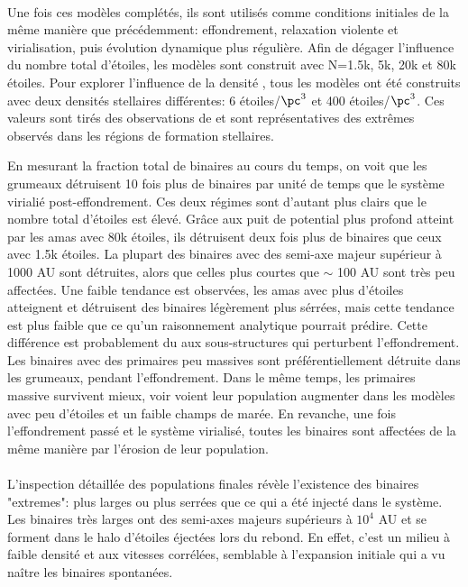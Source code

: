 \paragraph*{}
Une fois ces modèles complétés, ils sont utilisés comme conditions initiales de la même manière que précédemment: effondrement, relaxation violente et virialisation, puis évolution dynamique plus régulière. Afin de dégager l'influence du nombre total d'étoiles, les modèles sont construit avec N=1.5k, 5k, 20k et 80k étoiles. Pour explorer l'influence de la densité , tous les modèles ont été construits avec deux densités stellaires différentes: 6 étoiles/$\pc^3$ et 400 étoiles/$\pc^3$. Ces valeurs sont tirés des observations de \cite{King2012,King2012a} et sont représentatives des extrêmes observés dans les régions de formation stellaires.

En mesurant la fraction total de binaires au cours du temps, on voit que les grumeaux détruisent 10 fois plus de binaires par unité de temps que le système virialié post-effondrement. Ces deux régimes sont d'autant plus clairs que le nombre total d'étoiles est élevé. Grâce aux puit de potential plus profond atteint par les amas avec 80k étoiles, ils détruisent deux fois plus de binaires que ceux avec 1.5k étoiles. La plupart des binaires avec des semi-axe majeur supérieur à 1000 AU sont détruites, alors que celles plus courtes que $\sim$ 100 AU sont très peu affectées. Une faible tendance est observées, les amas avec plus d'étoiles atteignent et détruisent des binaires légèrement plus sérrées, mais cette tendance est plus faible que ce qu'un raisonnement analytique pourrait prédire. Cette différence est probablement du aux sous-structures qui perturbent l'effondrement. Les binaires avec des primaires peu massives sont préférentiellement détruite dans les grumeaux, pendant l'effondrement. Dans le même temps, les primaires massive survivent mieux, voir voient leur population augmenter dans les modèles avec peu d'étoiles et un faible champs de marée. En revanche, une fois l'effondrement passé et le système virialisé, toutes les binaires sont affectées de la même manière par l'érosion de leur population.

\paragraph*{}
L'inspection détaillée des populations finales révèle l'existence des binaires "extremes": plus larges ou plus serrées que ce qui a été injecté dans le système. Les binaires très larges ont des semi-axes majeurs supérieurs à $10^4$ AU et se forment dans le halo d'étoiles éjectées lors du rebond. En effet, c'est un milieu à faible densité et aux vitesses corrélées, semblable à l'expansion initiale qui a vu naître les binaires spontanées.

